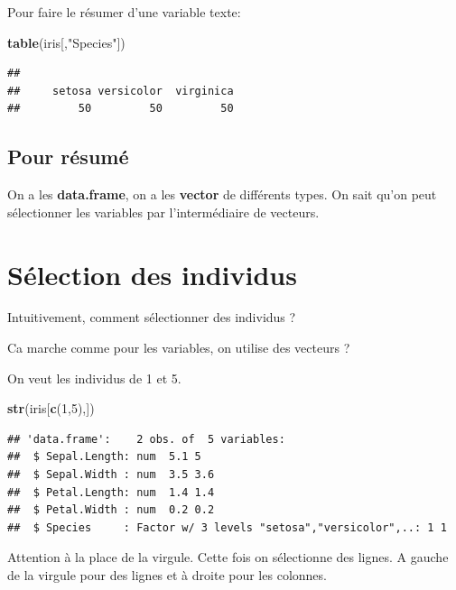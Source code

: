 \documentclass[
]{book}
\newenvironment{Shaded}{\begin{snugshade}}{\end{snugshade}}
\newcommand{\DecValTok}[1]{\textcolor[rgb]{0.00,0.00,0.81}{#1}}
\newcommand{\FunctionTok}[1]{\textcolor[rgb]{0.13,0.29,0.53}{\textbf{#1}}}
\newcommand{\NormalTok}[1]{#1}
\newcommand{\StringTok}[1]{\textcolor[rgb]{0.31,0.60,0.02}{#1}}
\begin{document}
Pour faire le résumer d'une variable texte:

\begin{Shaded}
\begin{Highlighting}[]
\FunctionTok{table}\NormalTok{(iris[,}\StringTok{"Species"}\NormalTok{])}
\end{Highlighting}
\end{Shaded}

\begin{verbatim}
## 
##     setosa versicolor  virginica 
##         50         50         50
\end{verbatim}

\hypertarget{pour-ruxe9sumuxe9}{%
\subsection{Pour résumé}\label{pour-ruxe9sumuxe9}}

On a les \textbf{data.frame}, on a les \textbf{vector} de différents types. On sait qu'on
peut sélectionner les variables par l'intermédiaire de vecteurs.

\hypertarget{suxe9lection-des-individus}{%
\section{Sélection des individus}\label{suxe9lection-des-individus}}

Intuitivement, comment sélectionner des individus ?

Ca marche comme pour les variables, on utilise des vecteurs ?

On veut les individus de 1 et 5.

\begin{Shaded}
\begin{Highlighting}[]
\FunctionTok{str}\NormalTok{(iris[}\FunctionTok{c}\NormalTok{(}\DecValTok{1}\NormalTok{,}\DecValTok{5}\NormalTok{),])}
\end{Highlighting}
\end{Shaded}

\begin{verbatim}
## 'data.frame':    2 obs. of  5 variables:
##  $ Sepal.Length: num  5.1 5
##  $ Sepal.Width : num  3.5 3.6
##  $ Petal.Length: num  1.4 1.4
##  $ Petal.Width : num  0.2 0.2
##  $ Species     : Factor w/ 3 levels "setosa","versicolor",..: 1 1
\end{verbatim}

Attention à la place de la virgule. Cette fois on sélectionne des lignes. A gauche
de la virgule pour des lignes et à droite pour les colonnes.
\end{document}

